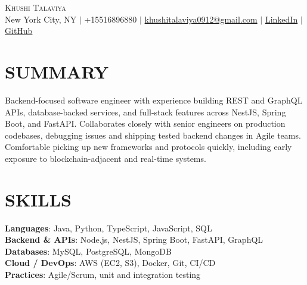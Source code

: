 \documentclass[letterpaper,11pt]{article}
\begin{document}
\begin{center}
    {\Huge \scshape Khushi Talaviya} \\ \vspace{2pt}
    \vspace{4pt}
    \small
    New York City, NY $|$
    \small
    +15516896880 $|$
    \href{mailto:khushitalaviya0912@gmail.com}{khushitalaviya0912@gmail.com} $|$
    \href{https://www.linkedin.com/in/khushitalaviya/}{LinkedIn} $|$
    \href{https://github.com/talaviyakhushi}{GitHub}
\end{center}

\section{SUMMARY}
\vspace{5pt}
\small{Backend-focused software engineer with experience building REST and GraphQL APIs, database-backed services, and full-stack features across NestJS, Spring Boot, and FastAPI. Collaborates closely with senior engineers on production codebases, debugging issues and shipping tested backend changes in Agile teams. Comfortable picking up new frameworks and protocols quickly, including early exposure to blockchain-adjacent and real-time systems.}

\vspace{2pt}
\section{SKILLS}
\vspace{5pt}
\begin{itemize}[leftmargin=0in, label={}]
\small{\item{
\textbf{Languages}{: Java, Python, TypeScript, JavaScript, SQL} \\
\textbf{Backend \& APIs}{: Node.js, NestJS, Spring Boot, FastAPI, GraphQL} \\
\textbf{Databases}{: MySQL, PostgreSQL, MongoDB} \\
\textbf{Cloud / DevOps}{: AWS (EC2, S3), Docker, Git, CI/CD} \\
\textbf{Practices}{: Agile/Scrum, unit and integration testing}
}}
\end{itemize}
\vspace{-10pt}

\end{document}
